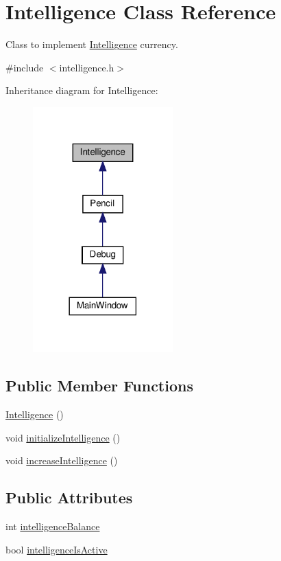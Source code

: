 \hypertarget{classIntelligence}{}\section{Intelligence Class Reference}
\label{classIntelligence}


Class to implement \hyperlink{classIntelligence}{Intelligence} currency.  




{\ttfamily \#include $<$intelligence.\+h$>$}



Inheritance diagram for Intelligence\+:\nopagebreak
\begin{figure}[H]
\begin{center}
\leavevmode
\includegraphics[width=153pt]{classIntelligence__inherit__graph}
\end{center}
\end{figure}
\subsection*{Public Member Functions}
\begin{DoxyCompactItemize}
\item 
\hyperlink{classIntelligence_a146fc36901bb5993c71b0d9426439fea}{Intelligence} ()
\item 
void \hyperlink{classIntelligence_a7a85f46b0628c2c018a729a15f78b322}{initialize\+Intelligence} ()
\item 
void \hyperlink{classIntelligence_ad822db7ef4eef6c1f797f65c73fec3f0}{increase\+Intelligence} ()
\end{DoxyCompactItemize}
\subsection*{Public Attributes}
\begin{DoxyCompactItemize}
\item 
int \hyperlink{classIntelligence_a20fc418262dd34db0d9e99d81d6a7544}{intelligence\+Balance}
\item 
bool \hyperlink{classIntelligence_ad8d4fda31beb86dc434f71fe6c683ae9}{intelligence\+Is\+Active}
\end{DoxyCompactItemize}


